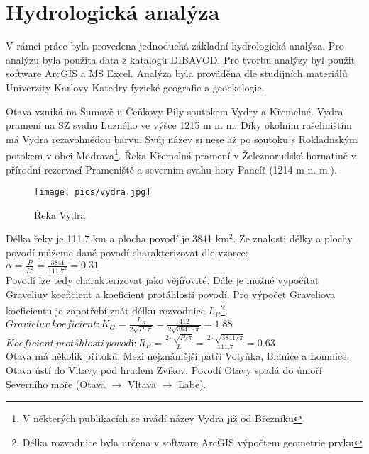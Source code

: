 \documentclass[thesis=M,czech]{FITthesis}[2012/06/26]
\begin{document}
\section{Hydrologická analýza}
V rámci práce byla provedena jednoduchá základní hydrologická analýza. Pro analýzu byla použita data z katalogu DIBAVOD. Pro tvorbu analýzy byl použit software ArcGIS a MS Excel. Analýza byla prováděna dle studijních materiálů Univerzity Karlovy Katedry fyzické geografie a geoekologie. \cite{UK}

Otava vzniká na Šumavě u Čeňkovy Pily soutokem Vydry a Křemelné. Vydra pramení na SZ svahu Luzného ve výšce 1215 m n. m. Díky okolním rašeliništím má Vydra rezavohnědou barvu. Svůj název si nese až po soutoku s Rokladnským potokem v obci Modrava\footnote{V některých publikacích se uvádí název Vydra již od Březníku}. Řeka Křemelná pramení v Železnorudské hornatině v přírodní rezervací Prameniště a severním svahu hory Pancíř (1214 m n. m.). \cite{SMOOS}

\begin{figure}[h!]
	\centering
	\texttt{[image: pics/vydra.jpg]}
	\caption{Řeka Vydra}
	\label{obrazek:ot1}
\end{figure}

Délka řeky je 111.7 km a plocha povodí je 3841 km$^2$. Ze znalosti délky a plochy povodí můžeme dané povodí charakterizovat dle vzorce:
\\

$\alpha = \frac{P}{L^2} = \frac{3841}{111.7^2} = 0.31$ \\


Povodí lze tedy charakterizovat jako vějířovité. Dále je možné vypočítat Graveliuv koeficient a koeficient protáhlosti povodí. Pro výpočet Graveliova koeficientu je zapotřebí znát délku rozvodnice $L_R$\footnote{Délka rozvodnice byla určena v software ArcGIS výpočtem geometrie prvku}. \\

$Gravieluv\ koeficient: K_G = \frac{L_R}{2 \sqrt{P \cdot \pi}} = \frac{412}{2\sqrt{3841\cdot \pi}} = 1.88$ \\

$Koeficient\ protáhlosti\ povodí: R_E = \frac{2\cdot \sqrt{P / \pi}}{L} = \frac{2 \cdot \sqrt{3841 / \pi}}{111.7} = 0.63 $ \\

Otava má několik přítoků. Mezi nejznámější patří Volyňka, Blanice a Lomnice. Otava ústí do Vltavy pod hradem Zvíkov. Povodí Otavy spadá do úmoří Severního moře (Otava $\rightarrow$ Vltava $\rightarrow$ Labe). 
\end{document}

